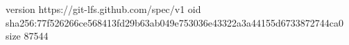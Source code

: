 version https://git-lfs.github.com/spec/v1
oid sha256:77f526266ce568413fd29b63ab049e753036e43322a3a44155d6733872744ca0
size 87544
